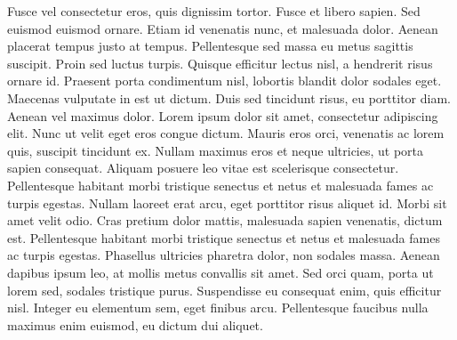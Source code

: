\documentclass{article}
\begin{document}
Fusce vel consectetur eros, quis dignissim tortor. Fusce et libero sapien. Sed euismod euismod ornare. Etiam id venenatis nunc, et malesuada dolor. Aenean placerat tempus justo at tempus. Pellentesque sed massa eu metus sagittis suscipit. Proin sed luctus turpis. Quisque efficitur lectus nisl, a hendrerit risus ornare id. Praesent porta condimentum nisl, lobortis blandit dolor sodales eget. Maecenas vulputate in est ut dictum. Duis sed tincidunt risus, eu porttitor diam. Aenean vel maximus dolor.
Lorem ipsum dolor sit amet, consectetur adipiscing elit. Nunc ut velit eget eros congue dictum. Mauris eros orci, venenatis ac lorem quis, suscipit tincidunt ex. Nullam maximus eros et neque ultricies, ut porta sapien consequat. Aliquam posuere leo vitae est scelerisque consectetur. Pellentesque habitant morbi tristique senectus et netus et malesuada fames ac turpis egestas. Nullam laoreet erat arcu, eget porttitor risus aliquet id. Morbi sit amet velit odio. Cras pretium dolor mattis, malesuada sapien venenatis, dictum est. Pellentesque habitant morbi tristique senectus et netus et malesuada fames ac turpis egestas. Phasellus ultricies pharetra dolor, non sodales massa. Aenean dapibus ipsum leo, at mollis metus convallis sit amet. Sed orci quam, porta ut lorem sed, sodales tristique purus. Suspendisse eu consequat enim, quis efficitur nisl. Integer eu elementum sem, eget finibus arcu. Pellentesque faucibus nulla maximus enim euismod, eu dictum dui aliquet.
\end{document}
